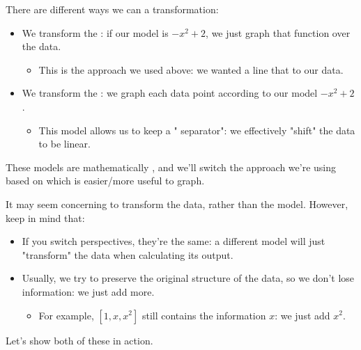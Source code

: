         \begin{clarification}
            There are  different ways we can  a transformation:
            \begin{itemize}
                \item We transform the : if our model is $-x^2+2$, we just graph that function over the data.
                    \begin{itemize}
                        \item This is the approach we used above: we wanted a line that  to our data.
                    \end{itemize}
                \item We transform the : we graph each data point according to our model $-x^2+2$.
                    \begin{itemize}
                        \item This model allows us to keep a " separator": we effectively "shift" the data to be linear.
                    \end{itemize}
            \end{itemize}

            These models are mathematically , and we'll switch the approach we're using based on which is easier/more useful to graph.
        \end{clarification}

        It may seem concerning to transform the data, rather than the model. However, keep in mind that:

        \begin{itemize}
            \item If you switch perspectives, they're the same: a different model will just "transform" the data when calculating its output.
            
            \item Usually, we try to preserve the original structure of the data, so we don't lose information: we just add more.
                \begin{itemize}
                    \item For example, $[1,x,x^2]$ still contains the information $x$: we just add $x^2$.
                \end{itemize}
        \end{itemize}

        \miniex Let's show both of these in action.

